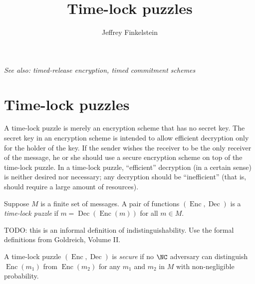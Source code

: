 \documentclass{article}
\title{Time-lock puzzles}
\author{Jeffrey Finkelstein}
\newcommand{\Enc}{\operatorname{Enc}}
\newcommand{\Dec}{\operatorname{Dec}}
\begin{document}
\maketitle



\emph{See also: timed-release encryption, timed commitment schemes}

\section{Time-lock puzzles}

A time-lock puzzle is merely an encryption scheme that has no secret key.
The secret key in an encryption scheme is intended to allow efficient decryption only for the holder of the key.
If the sender wishes the receiver to be the only receiver of the message, he or she should use a secure encryption scheme on top of the time-lock puzzle.
In a time-lock puzzle, ``efficient'' decryption (in a certain sense) is neither desired nor necessary; any decryption should be ``inefficient'' (that is, should require a large amount of resources).

\begin{definition}
  Suppose $M$ is a finite set of messages.
  A pair of functions $(\Enc, \Dec)$ is a \emph{time-lock puzzle} if $m = \Dec(\Enc(m))$ for all $m \in M$.
\end{definition}

\begin{definition}
  TODO: this is an informal definition of indistinguishability.
  Use the formal definitions from Goldreich, Volume II.

  A time-lock puzzle $(\Enc, \Dec)$ is \emph{secure} if no $\NC$ adversary can distinguish $\Enc(m_1)$ from $\Enc(m_2)$ for any $m_1$ and $m_2$ in $M$ with non-negligible probability.
\end{definition}
\end{document}
